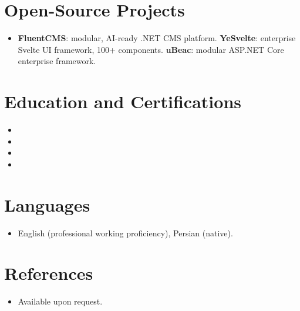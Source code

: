 \documentclass[11pt,a4paper,sans]{moderncv}
\begin{document}

\section{Open-Source Projects}
\vspace{1pt}
\begin{itemize}
\item {\textbf{FluentCMS}: modular, AI-ready .NET CMS platform. \textbf{YeSvelte}: enterprise Svelte UI framework, 100+ components. \textbf{uBeac}: modular ASP.NET Core enterprise framework.}
\end{itemize}


\section{Education and Certifications}
\vspace{1pt}
\begin{itemize}

\item{}
\item{}
\item{}
\item{}

\end{itemize}


\enlargethispage{2\baselineskip}
\section{Languages}
\vspace{1pt}
\begin{itemize}
\item {English (professional working proficiency), Persian (native).}
\end{itemize}


\section{References}
\vspace{1pt}
\begin{itemize}
\item{Available upon request.}
\end{itemize}
\end{document}
